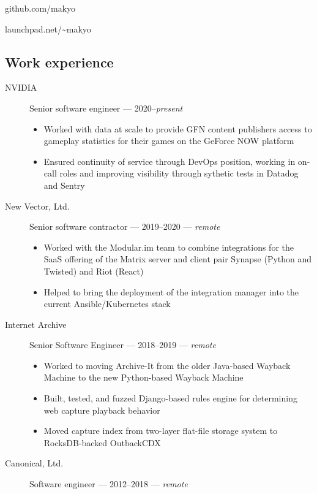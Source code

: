 \noindent github.com/makyo

\noindent launchpad.net/\textasciitilde{}makyo

\subsection{Work experience}

\begin{description}
    \item[NVIDIA]
    Senior software engineer --- 2020--\emph{present}

    \begin{itemize}
        \tightlist
        \item
        Worked with data at scale to provide GFN content publishers access to gameplay statistics for their games on the GeForce NOW platform
        \item
        Ensured continuity of service through DevOps position, working in on-call roles and improving visibility through sythetic tests in Datadog and Sentry
    \end{itemize}
    \item[New Vector, Ltd.]
    Senior software contractor --- 2019--2020 --- \emph{remote}

    \begin{itemize}
        \tightlist
        \item
        Worked with the Modular.im team to combine integrations for the SaaS offering of the Matrix server and client pair Synapse (Python and Twisted) and Riot (React)
        \item
        Helped to bring the deployment of the integration manager into the current Ansible/Kubernetes stack
    \end{itemize}
    \item[Internet Archive]
    Senior Software Engineer --- 2018--2019 --- \emph{remote}

    \begin{itemize}
        \tightlist
        \item
        Worked to moving Archive-It from the older Java-based Wayback Machine to the new Python-based Wayback Machine
        \item
        Built, tested, and fuzzed Django-based rules engine for determining web capture playback behavior
        \item
        Moved capture index from two-layer flat-file storage system to RocksDB-backed OutbackCDX
    \end{itemize}
    \item[Canonical, Ltd.]
    Software engineer --- 2012--2018 --- \emph{remote}


\end{description}
